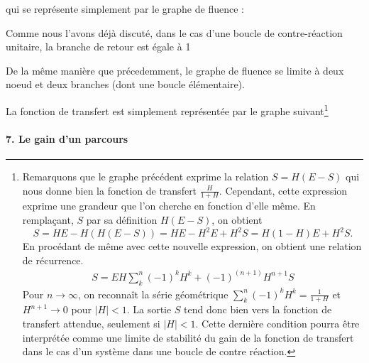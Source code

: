 qui se représente simplement par le graphe de fluence :
\begin{center}
    
\end{center}
Comme nous l'avons déjà discuté, dans le cas d'une boucle 
de contre-réaction unitaire, la branche de retour est égale à 1
\begin{center}
    
\end{center}
De la même manière que précedemment, le graphe de fluence se limite à 
deux noeud et deux branches (dont une boucle élémentaire).
\begin{center}
    
\end{center}
La fonction de transfert est simplement représentée par le graphe 
suivant\footnote{Remarquons que le graphe précédent exprime la relation 
$S=H(E-S)$ qui nous donne bien la fonction de transfert $\frac{H}{1+H}$. 
Cependant, cette expression exprime une grandeur que l'on cherche en fonction 
d'elle même. En remplaçant, $S$ par sa définition $H(E-S)$, on obtient
$$S=HE-H(H(E-S))=HE-H^2E+H^2S=H(1-H)E+H^2S.$$ En procédant de même avec 
cette nouvelle expression, on obtient une relation de récurrence. 
\begin{align*}
    S=EH\sum_k^n (-1)^kH^k+(-1)^{(n+1)}H^{n+1}S
\end{align*}
Pour $n\rightarrow\infty$, on reconnaît la série géométrique 
$\sum_k^n(-1)^kH^k=\frac{1}{1+H}$ et $H^{n+1}\rightarrow 0$ pour $|H|<1$.
La sortie $S$ tend donc bien vers la fonction de transfert attendue, 
seulement si $|H|<1$. Cette dernière condition pourra être interprétée 
comme une limite de stabilité du gain de la fonction de transfert dans 
le cas d'un système dans une boucle de contre réaction.}
\begin{center}
    
\end{center}

\paragraph{7. Le gain d'un parcours}

